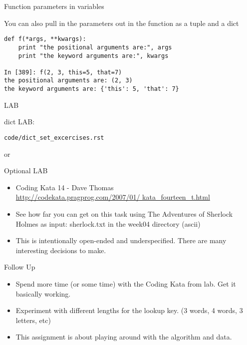 \documentclass{beamer}
\begin{document}
\begin{frame}[fragile]{Function parameters in variables}

{\Large You can also pull in the parameters out in the function as a tuple and a dict
}
\begin{verbatim}
def f(*args, **kwargs):
    print "the positional arguments are:", args
    print "the keyword arguments are:", kwargs
 
In [389]: f(2, 3, this=5, that=7)
the positional arguments are: (2, 3)
the keyword arguments are: {'this': 5, 'that': 7}
\end{verbatim}

\end{frame} 

\begin{frame}[fragile]{LAB}

{\Large dict LAB:}

\verb|code/dict_set_excercises.rst|

\vfill

or

\vfill
{\Large Optional LAB}


\begin{itemize}
  \item Coding Kata 14 - Dave Thomas \\
    \url{http://codekata.pragprog.com/2007/01/ kata_fourteen_t.html}
  \item See how far you can get on this task using The Adventures of Sherlock Holmes as input: sherlock.txt in the week04 directory (ascii)
  \item  This is intentionally open-ended and underspecified. There are many interesting decisions to make.
\end{itemize}

\end{frame}

\begin{frame}{Follow Up}

\begin{itemize}
  \item Spend more time (or some time) with the Coding Kata from lab. Get it basically working.
  \item Experiment with different lengths for the lookup key. (3 words, 4 words, 3 letters, etc)
  \item This assignment is about playing around with the algorithm and data.
\end{itemize}

\end{frame}
\end{document}
